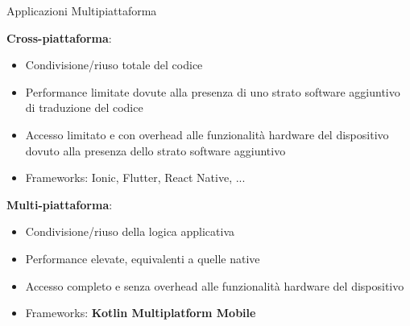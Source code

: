 \begin{frame}{Applicazioni Multipiattaforma}

    \textbf{Cross-piattaforma}:
    \begin{itemize}
        \item Condivisione/riuso totale del codice
        \item Performance limitate dovute alla presenza di uno strato software aggiuntivo di traduzione del codice
        \item Accesso limitato e con overhead alle funzionalità hardware del dispositivo dovuto alla presenza dello strato software aggiuntivo
        \item Frameworks: Ionic, Flutter, React Native, ...
    \end{itemize}
    
    \vspace{5mm}
    
    \textbf{Multi-piattaforma}:
    \begin{itemize}
        \item Condivisione/riuso della logica applicativa
        \item Performance elevate, equivalenti a quelle native
        \item Accesso completo e senza overhead alle funzionalità hardware del dispositivo
        \item Frameworks: \textbf{Kotlin Multiplatform Mobile}
    \end{itemize}
    
\end{frame}

